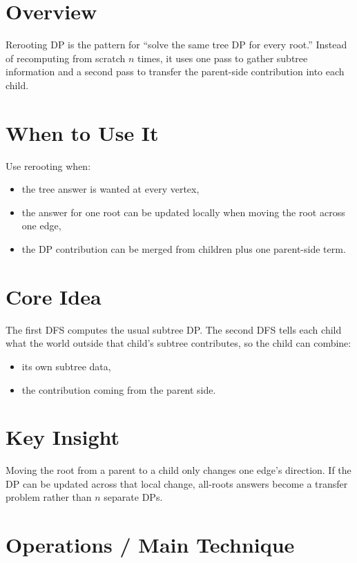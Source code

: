 \section*{Overview}

Rerooting DP is the pattern for ``solve the same tree DP for every root.'' Instead of recomputing from scratch \(n\)
times, it uses one pass to gather subtree information and a second pass to transfer the parent-side contribution into
each child.

\section*{When to Use It}

Use rerooting when:

\begin{itemize}
  \item the tree answer is wanted at every vertex,
  \item the answer for one root can be updated locally when moving the root across one edge,
  \item the DP contribution can be merged from children plus one parent-side term.
\end{itemize}

\section*{Core Idea}

The first DFS computes the usual subtree DP. The second DFS tells each child what the world outside that child's
subtree contributes, so the child can combine:

\begin{itemize}
  \item its own subtree data,
  \item the contribution coming from the parent side.
\end{itemize}

\section*{Key Insight}

Moving the root from a parent to a child only changes one edge's direction. If the DP can be updated across that local
change, all-roots answers become a transfer problem rather than \(n\) separate DPs.

\section*{Operations / Main Technique}

